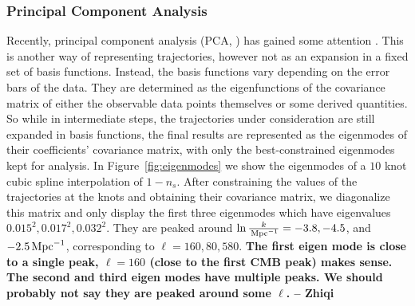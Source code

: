 \documentclass[a4paper,11pt]{article}
\def\mpc{{\rm\,Mpc}}
\def\mpc{{\rm\,Mpc}}
\newcommand{\pmv}[1]{{\color{red}  \bf{#1} -- PMV}}
\newcommand{\zq}[1]{{\color{red} \bf{ #1} -- Zhiqi}}
\begin{document}
\subsubsection{Principal Component Analysis}
Recently, principal component analysis (PCA, \cite{Huterer:2002hy})
has gained some attention \cite{Dvorkin:2010dn}. This is another way
of representing trajectories, however not as an expansion in a fixed
set of basis functions. Instead, the basis functions vary depending on
the error bars of the data. They are determined as the eigenfunctions
of the covariance matrix of either the observable data points
themselves or some derived quantities. So while in intermediate steps,
the trajectories under consideration are still expanded in basis
functions, the final results are represented as the eigenmodes of
their coefficients' covariance matrix, with only the best-constrained
eigenmodes kept for analysis. In Figure~\ref{fig:eigenmodes} we show
the eigenmodes of a $10$ knot cubic spline interpolation of
$1-n_s$. After constraining the values of the trajectories at the
knots and obtaining their covariance matrix, we diagonalize this
matrix and only display the first three eigenmodes which have
eigenvalues $0.015^2, 0.017^2, 0.032^2$. They are peaked
around $\ln \frac{k}{\mpc^{-1}}=-3.8, -4.5$, and $-2.5\mpc^{-1}$,
corresponding to $\ell=160,80, 580$. 
\zq{The first eigen mode is close to a single peak, $\ell = 160$ (close to the first CMB peak) makes sense. The second and third eigen modes have multiple peaks. We should probably not say they are peaked around some $\ell$.}
\end{document}
